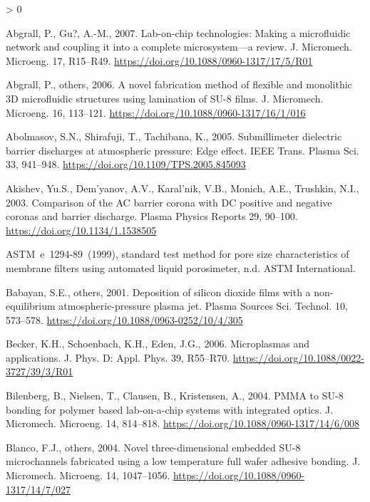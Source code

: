 \documentclass[
  11pt,
  twoside]{article}
\newlength{\cslhangindent}
\newenvironment{CSLReferences}[2] %
 {%
  \setlength{\parindent}{0pt}
  \ifodd #1 \everypar{\setlength{\hangindent}{\cslhangindent}}\ignorespaces\fi
  \ifnum #2 > 0
  \setlength{\parskip}{#2\baselineskip}
  \fi
 }%
 {}
\begin{document}
\hypertarget{refs}{}
\begin{CSLReferences}{1}{0}
\leavevmode\hypertarget{ref-EMPad20}{}%
Abgrall, P., Gu?, A.-M., 2007. Lab-on-chip technologies: Making a microfluidic network and coupling it into a complete microsystem---a review. J. Micromech. Microeng. 17, R15--R49. \url{https://doi.org/10.1088/0960-1317/17/5/R01}

\leavevmode\hypertarget{ref-Abgr06}{}%
Abgrall, P., others, 2006. A novel fabrication method of flexible and monolithic {3D microfluidic structures using lamination of SU-8} films. J. Micromech. Microeng. 16, 113--121. \url{https://doi.org/10.1088/0960-1317/16/1/016}

\leavevmode\hypertarget{ref-Abol05}{}%
Abolmasov, S.N., Shirafuji, T., Tachibana, K., 2005. Submillimeter dielectric barrier discharges at atmospheric pressure: Edge effect. IEEE Trans. Plasma Sci. 33, 941--948. \url{https://doi.org/10.1109/TPS.2005.845093}

\leavevmode\hypertarget{ref-Akis03}{}%
Akishev, Yu.S., Dem'yanov, A.V., Karal'nik, V.B., Monich, A.E., Trushkin, N.I., 2003. Comparison of the AC barrier corona with DC positive and negative coronas and barrier discharge. Plasma Physics Reports 29, 90--100. \url{https://doi.org/10.1134/1.1538505}

\leavevmode\hypertarget{ref-ASTME1294}{}%
{ASTM}~e~1294-89~(1999), standard test method for pore size characteristics of membrane filters using automated liquid porosimeter, n.d. ASTM International.

\leavevmode\hypertarget{ref-Baba01}{}%
Babayan, S.E., others, 2001. Deposition of silicon dioxide films with a non-equilibrium atmospheric-pressure plasma jet. Plasma Sources Sci. Technol. 10, 573--578. \url{https://doi.org/10.1088/0963-0252/10/4/305}

\leavevmode\hypertarget{ref-Beck06}{}%
Becker, K.H., Schoenbach, K.H., Eden, J.G., 2006. Microplasmas and applications. J. Phys. D: Appl. Phys. 39, R55--R70. \url{https://doi.org/10.1088/0022-3727/39/3/R01}

\leavevmode\hypertarget{ref-Bile04}{}%
Bilenberg, B., Nielsen, T., Clausen, B., Kristensen, A., 2004. PMMA to SU-8 bonding for polymer based lab-on-a-chip systems with integrated optics. J. Micromech. Microeng. 14, 814--818. \url{https://doi.org/10.1088/0960-1317/14/6/008}

\leavevmode\hypertarget{ref-Blan04}{}%
Blanco, F.J., others, 2004. Novel three-dimensional embedded {SU-8} microchannels fabricated using a low temperature full wafer adhesive bonding. J. Micromech. Microeng. 14, 1047--1056. \url{https://doi.org/10.1088/0960-1317/14/7/027}


\end{CSLReferences}
\end{document}
